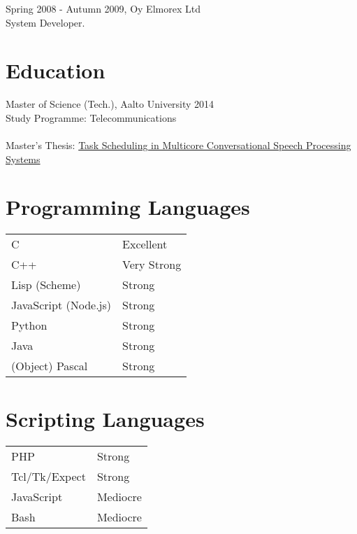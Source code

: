 \documentclass[12pt]{article}
\begin{document}
\large{Spring 2008 - Autumn 2009, Oy Elmorex Ltd}\\
\normalsize{System Developer.}\\


\section*{Education}

\large{Master of Science (Tech.), Aalto University 2014}\\
\normalsize{
Study Programme: Telecommunications\\
\\
Master's Thesis:
\href{https://aaltodoc.aalto.fi/bitstream/handle/123456789/14402/master_
Lindroos_Michele_2014.pdf?sequence=1}
{Task Scheduling in Multicore Conversational Speech Processing Systems}
}


\section*{Programming Languages}

\begin{tabular}{ll}
C & Excellent\\
C++ & Very Strong\\
Lisp (Scheme) & Strong\\
JavaScript (Node.js) & Strong\\
Python & Strong\\
Java & Strong\\
(Object) Pascal & Strong\\
\end{tabular}


\section*{Scripting Languages}

\begin{tabular}{ll}
PHP & Strong\\
Tcl/Tk/Expect & Strong\\
JavaScript & Mediocre\\
Bash & Mediocre\\
\end{tabular}
\end{document}
